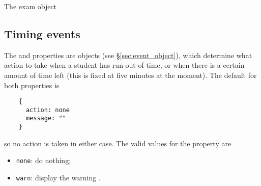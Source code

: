 \begin{chapter}{\label{cha:exam_object}The exam object}
  \subsection{\label{sec:timing_events}Timing events}
  The  and  properties are
   objects (see \S\ref{sec:event_object}), which determine what
  action to take when a student has run out of time, or when there is a certain
  amount of time left (this is fixed at five minutes at the moment).  The
  default for both properties is
  \begin{Verbatim}
    {
      action: none
      message: ""
    }
  \end{Verbatim}
  so no action is taken in either case.  The valid values for the
   property are
  \begin{itemize}
    \item \verb"none": do nothing;
    \item \verb"warn": display the warning .
  \end{itemize}


\end{chapter}
